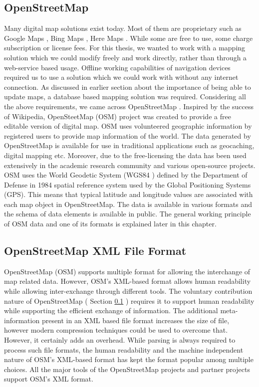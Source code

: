 \subsection{OpenStreetMap} \label{osm}
Many digital map solutions exist today. Most of them are proprietary such as Google Maps \cite{googlemaps}, Bing Maps \cite{bingmaps}, Here Maps \cite{heremaps}. While some are free to use, some charge subscription or license fees. For this thesis, we wanted to work with a mapping solution which we could modify freely and work directly, rather than through a web-service based usage. Offline working capabilities of navigation devices required us to use a solution which we could work with without any internet connection. As discussed in earlier section about the importance of being able to update maps, a database based mapping solution was required. Considering all the above requirements, we came across OpenStreetMap \cite{osmmaps}. Inspired by the success of Wikipedia, OpenSteetMap (OSM) project was created to provide a free editable version of digital map. OSM uses volunteered geographic information by registered users to provide map information of the world. The data generated by OpenStreetMap is available for use in traditional applications such as geocaching, digital mapping etc. Moreover, due to the free-licensing the data has been used extensively in the academic research community and various open-source projects. \\

OSM uses the World Geodetic System (WGS84 \cite{wgs84}) defined by the Department of Defense in 1984 spatial reference system used by the Global Positioning Systems (GPS). This means that typical latitude and longitude values are associated with each map object in OpenStreetMap. The data is available in various formats and the schema of data elements is available in public. The general working principle of OSM data and one of its formats is explained later in this chapter.
\subsection{OpenStreetMap XML File Format}\label{osmxmlff}
OpenStreetMap (OSM) supports multiple format for allowing the interchange of map related data. However, OSM's XML-based \cite{osmxml} format allows human readability while allowing inter-exchange through different tools. The voluntary contribution nature of OpenStreetMap ( Section \ref{osm} ) requires it to support human readability while supporting the efficient exchange of information. The additional meta-information present in an XML based file format increases the size of file, however modern compression techniques could be used to overcome that. However, it certainly adds an overhead. While parsing is always required to process such file formats, the human readability and the machine independent nature of OSM's XML-based format has kept the format popular among multiple choices. All the major tools of the OpenStreetMap projects and partner projects support OSM's XML format. \\


